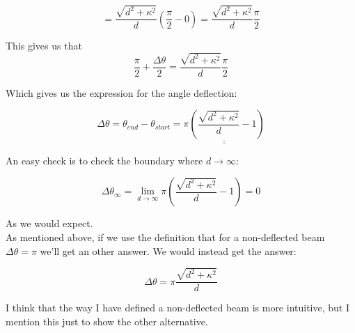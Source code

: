 \documentclass[a4paper,norsk, 10pt]{article}
\begin{document}
$$
= \frac{\sqrt{d^2 +\kappa^2}}{d} \left(\frac{\pi}{2} - 0\right) = \frac{\sqrt{d^2 +\kappa^2}}{d} \frac{\pi}{2}
$$

This gives us that 
$$
\frac{\pi}{2} + \frac{\Delta \theta}{2} = \frac{\sqrt{d^2 +\kappa^2}}{d} \frac{\pi}{2}
$$


Which gives us the expression for the angle deflection:

$$
\Delta \theta = \theta_{end} - \theta_{start} = \underline{\underline{\pi \left(\frac{\sqrt{d^2 +\kappa^2}}{d} - 1\right)}}
$$

An easy check is to check the boundary where $d \rightarrow \infty$:

$$
\Delta \theta_{\infty} = \lim_{d\rightarrow \infty}  \pi \left(\frac{\sqrt{d^2 +\kappa^2}}{d} - 1\right) = 0
$$

As we would expect.\\

 As mentioned above, if we use the definition that for a non-deflected beam $\Delta \theta = \pi$ we'll get an other answer. We would instead get the answer:

$$
\Delta \theta = \pi\frac{\sqrt{d^2 + \kappa^2}}{d}
$$

I think that the way I have defined a non-deflected beam is more intuitive, but I mention this just to show the other alternative.
\end{document}
